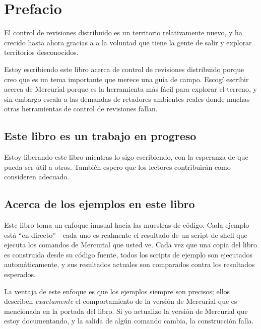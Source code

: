\chapter*{Prefacio}
\label{chap:preface}

El control de revisiones distribuido es un territorio relativamente 
nuevo, y ha crecido hasta ahora 
gracias a  a la voluntad que tiene la gente de salir y explorar
territorios desconocidos.

Estoy escribiendo este libro acerca de control de revisiones
distribuido porque creo que es un tema importante que merece una guía
de campo. Escogí escribir acerca de Mercurial porque es la herramienta
más fácil para explorar el terreno, y sin embargo escala a las
demandas de retadores ambientes reales donde muchas otras herramientas
de control de revisiones fallan.

\section{Este libro es un trabajo en progreso}
Estoy liberando este libro mientras lo sigo escribiendo, con la
esperanza de que pueda ser útil a otros. También espero que los
lectores contribuirán como consideren adecuado.

\section{Acerca de los ejemplos en este libro}
Este libro toma un enfoque inusual hacia las muestras de código. Cada
ejemplo está ``en directo''---cada uno es realmente el resultado de un
script de shell que ejecuta los comandos de Mercurial que usted ve.
Cada vez que una copia del libro es construida desde su código fuente,
todos los scripts de ejemplo son ejecutados automáticamente, y sus
resultados actuales son comparados contra los resultados esperados.

La ventaja de este enfoque es que los ejemplos siempre son precisos;
ellos describen \emph{exactamente} el comportamiento de la versión de
Mercurial que es mencionada en la portada del libro. Si yo actualizo
la versión de Mercurial que estoy documentando, y la salida de algún
comando cambia, la construcción falla.

